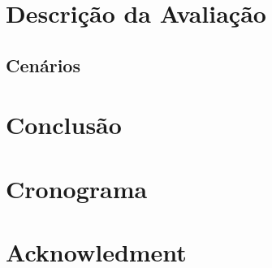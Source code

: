 \documentclass[a4paper, 12pt]{article}
\begin{document}
\section{Descrição da Avaliação}


\subsection{Cenários}


\section{Conclusão}



\section{Cronograma}


\section{Acknowledment}



% 



\end{document}
